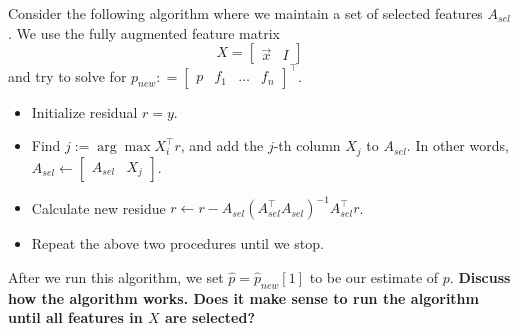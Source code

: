 \begin{enumerate}
\qitem Consider the following algorithm where we maintain a set of selected features $A_{sel}$. We use the fully augmented feature matrix 
$$
  X = \begin{bmatrix}
    \vec{x} & I
  \end{bmatrix}
$$
and try to solve for $p_{new}: = \begin{bmatrix}  p & f_1 &\ldots & f_n  \end{bmatrix}^\top$. 
\begin{itemize}
  \item Initialize residual $r = y$. \\
  \item Find $j:= \arg\max X_i^\top r$, and add the $j$-th column $X_j$ to $A_{sel}$. In other words, $A_{sel} \leftarrow \begin{bmatrix}
    A_{sel} & X_j
  \end{bmatrix}.$\\
  \item Calculate new residue $r \leftarrow r - A_{sel}(A_{sel}^\top A_{sel})^{-1} A_{sel}^\top r$. 
  \item Repeat the above two procedures until we stop.
\end{itemize}
After we run this algorithm, we set $\hat{p} = \hat{p}_{new}[1]$ to be our estimate of $p$. \textbf{Discuss how the algorithm works. Does it make sense to run the algorithm until all features in $X$ are selected?}





\end{enumerate}
